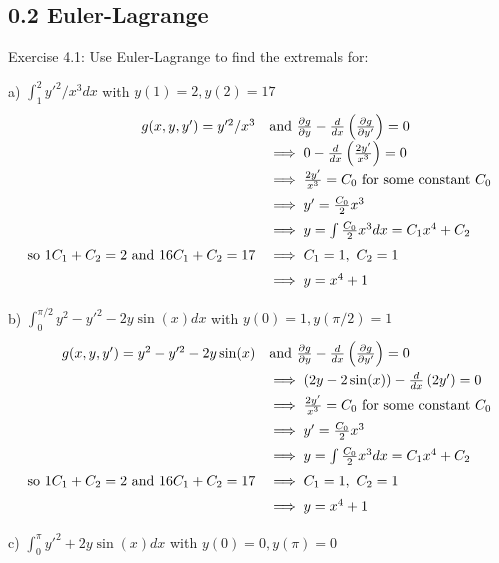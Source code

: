 \documentclass[11pt]{article}
\begin{document}
\subsection*{0.2 Euler-Lagrange}

Exercise 4.1: Use Euler-Lagrange to find the extremals for:

a) $\int_1^2y'^2/x^3dx$ with $y(1)=2,y(2)=17$
\[
\def\arraystretch{1.5}
\begin{array}{rl}
    g(x,y,y')=y'^2/x^3 &\textrm{and}\ 
    \frac{\partial g}{\partial y}-\frac{d}{dx}\left(\frac{\partial g}{\partial y'}\right)=0 \\
    &\implies 0-\frac{d}{dx}\left(\frac{2y'}{x^3}\right)=0 \\
    &\implies \frac{2y'}{x^3}=C_0\textrm{ for some constant $C_0$} \\
    &\implies y'=\frac{C_0}{2}x^3 \\
    &\implies y=\int\frac{C_0}{2}x^3dx=C_1x^4+C_2 \\
    \textrm{so }1C_1+C_2=2\textrm{ and }16C_1+C_2=17 &\implies
    C_1=1,\ C_2=1 \\
    &\implies y=x^4+1
\end{array}
\]

b) $\int_0^{\pi/2}y^2-y'^2-2y\sin(x) dx$ with $y(0)=1,y(\pi/2)=1$
\[
\def\arraystretch{1.5}
\begin{array}{rl}
    g(x,y,y')=y^2-y'^2-2y\sin(x) &\textrm{and}\ 
    \frac{\partial g}{\partial y}-\frac{d}{dx}\left(\frac{\partial g}{\partial y'}\right)=0 \\
    &\implies (2y-2\sin(x))-\frac{d}{dx}\left(2y'\right)=0 \\
    &\implies \frac{2y'}{x^3}=C_0\textrm{ for some constant $C_0$} \\
    &\implies y'=\frac{C_0}{2}x^3 \\
    &\implies y=\int\frac{C_0}{2}x^3dx=C_1x^4+C_2 \\
    \textrm{so }1C_1+C_2=2\textrm{ and }16C_1+C_2=17 &\implies
    C_1=1,\ C_2=1 \\
    &\implies y=x^4+1
\end{array}
\]


c) $\int_0^\pi y'^2+2y\sin(x) dx$ with $y(0)=0,y(\pi)=0$
\end{document}
